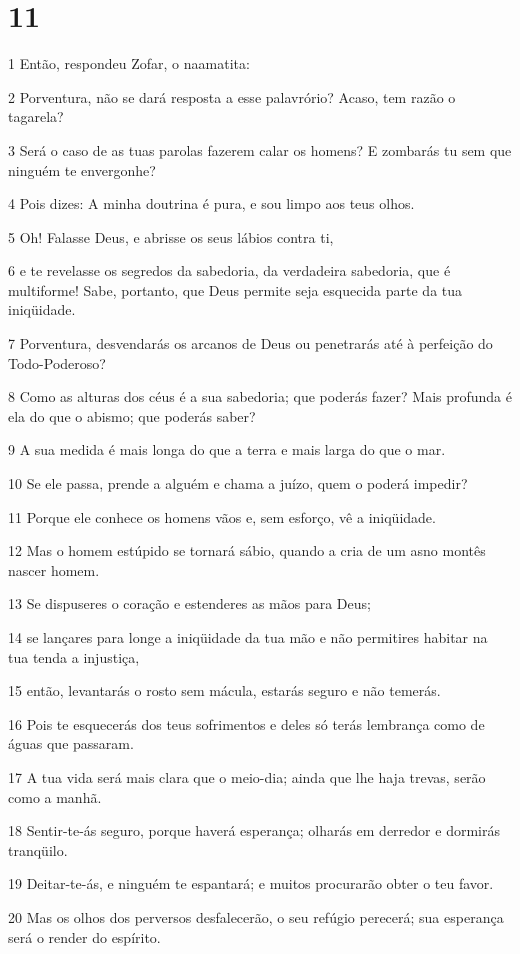\chapter{11}

\par 1 Então, respondeu Zofar, o naamatita:
\par 2 Porventura, não se dará resposta a esse palavrório? Acaso, tem razão o tagarela?
\par 3 Será o caso de as tuas parolas fazerem calar os homens? E zombarás tu sem que ninguém te envergonhe?
\par 4 Pois dizes: A minha doutrina é pura, e sou limpo aos teus olhos.
\par 5 Oh! Falasse Deus, e abrisse os seus lábios contra ti,
\par 6 e te revelasse os segredos da sabedoria, da verdadeira sabedoria, que é multiforme! Sabe, portanto, que Deus permite seja esquecida parte da tua iniqüidade.
\par 7 Porventura, desvendarás os arcanos de Deus ou penetrarás até à perfeição do Todo-Poderoso?
\par 8 Como as alturas dos céus é a sua sabedoria; que poderás fazer? Mais profunda é ela do que o abismo; que poderás saber?
\par 9 A sua medida é mais longa do que a terra e mais larga do que o mar.
\par 10 Se ele passa, prende a alguém e chama a juízo, quem o poderá impedir?
\par 11 Porque ele conhece os homens vãos e, sem esforço, vê a iniqüidade.
\par 12 Mas o homem estúpido se tornará sábio, quando a cria de um asno montês nascer homem.
\par 13 Se dispuseres o coração e estenderes as mãos para Deus;
\par 14 se lançares para longe a iniqüidade da tua mão e não permitires habitar na tua tenda a injustiça,
\par 15 então, levantarás o rosto sem mácula, estarás seguro e não temerás.
\par 16 Pois te esquecerás dos teus sofrimentos e deles só terás lembrança como de águas que passaram.
\par 17 A tua vida será mais clara que o meio-dia; ainda que lhe haja trevas, serão como a manhã.
\par 18 Sentir-te-ás seguro, porque haverá esperança; olharás em derredor e dormirás tranqüilo.
\par 19 Deitar-te-ás, e ninguém te espantará; e muitos procurarão obter o teu favor.
\par 20 Mas os olhos dos perversos desfalecerão, o seu refúgio perecerá; sua esperança será o render do espírito.

